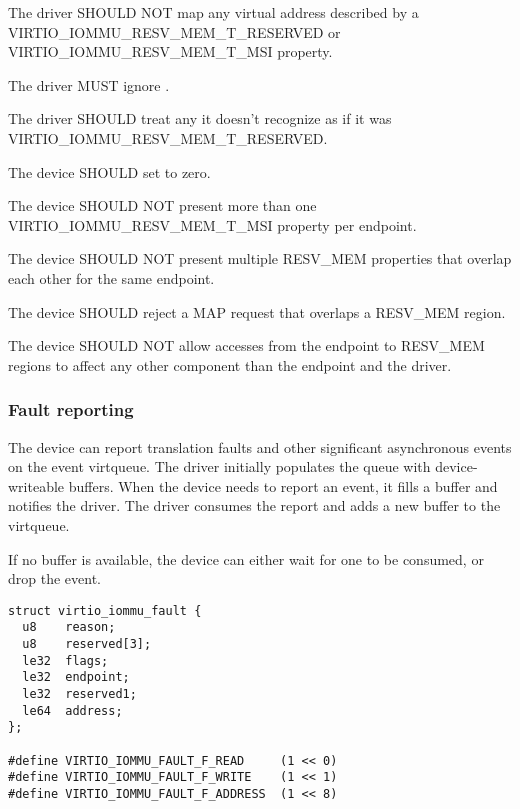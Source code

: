 
The driver SHOULD NOT map any virtual address described by a
VIRTIO_IOMMU_RESV_MEM_T_RESERVED or VIRTIO_IOMMU_RESV_MEM_T_MSI property.

The driver MUST ignore .

The driver SHOULD treat any  it doesn't recognize as if it
was VIRTIO_IOMMU_RESV_MEM_T_RESERVED.


The device SHOULD set  to zero.

The device SHOULD NOT present more than one VIRTIO_IOMMU_RESV_MEM_T_MSI
property per endpoint.

The device SHOULD NOT present multiple RESV_MEM properties that overlap
each other for the same endpoint.

The device SHOULD reject a MAP request that overlaps a RESV_MEM region.

The device SHOULD NOT allow accesses from the endpoint to RESV_MEM regions
to affect any other component than the endpoint and the driver.

\subsubsection{Fault reporting}\label{sev:Device Types / IOMMU Device / Device operations / Fault reporting}

The device can report translation faults and other significant
asynchronous events on the event virtqueue. The driver initially populates
the queue with device-writeable buffers. When the device needs to report
an event, it fills a buffer and notifies the driver. The driver consumes
the report and adds a new buffer to the virtqueue.

If no buffer is available, the device can either wait for one to be
consumed, or drop the event.

\begin{lstlisting}
struct virtio_iommu_fault {
  u8    reason;
  u8    reserved[3];
  le32  flags;
  le32  endpoint;
  le32  reserved1;
  le64  address;
};

#define VIRTIO_IOMMU_FAULT_F_READ     (1 << 0)
#define VIRTIO_IOMMU_FAULT_F_WRITE    (1 << 1)
#define VIRTIO_IOMMU_FAULT_F_ADDRESS  (1 << 8)
\end{lstlisting}

